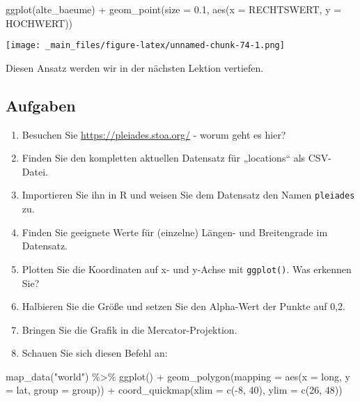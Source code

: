 \documentclass[
  ngerman,
]{article}
\newenvironment{Shaded}{\begin{snugshade}}{\end{snugshade}}
\newcommand{\AttributeTok}[1]{\textcolor[rgb]{0.77,0.63,0.00}{#1}}
\newcommand{\DecValTok}[1]{\textcolor[rgb]{0.00,0.00,0.81}{#1}}
\newcommand{\FloatTok}[1]{\textcolor[rgb]{0.00,0.00,0.81}{#1}}
\newcommand{\FunctionTok}[1]{\textcolor[rgb]{0.00,0.00,0.00}{#1}}
\newcommand{\NormalTok}[1]{#1}
\newcommand{\SpecialCharTok}[1]{\textcolor[rgb]{0.00,0.00,0.00}{#1}}
\newcommand{\StringTok}[1]{\textcolor[rgb]{0.31,0.60,0.02}{#1}}
\begin{document}
\begin{Shaded}
\begin{Highlighting}[]
\FunctionTok{ggplot}\NormalTok{(alte\_baeume) }\SpecialCharTok{+}
    \FunctionTok{geom\_point}\NormalTok{(}\AttributeTok{size =} \FloatTok{0.1}\NormalTok{, }\FunctionTok{aes}\NormalTok{(}\AttributeTok{x =}\NormalTok{ RECHTSWERT, }\AttributeTok{y =}\NormalTok{ HOCHWERT))}
\end{Highlighting}
\end{Shaded}

\texttt{[image: \_main\_files/figure-latex/unnamed-chunk-74-1.png]}

Diesen Ansatz werden wir in der nächsten Lektion vertiefen.

\hypertarget{aufgaben-3}{%
\subsection{Aufgaben}\label{aufgaben-3}}

\begin{enumerate}
\def\labelenumi{\arabic{enumi}.}
\item
  Besuchen Sie \url{https://pleiades.stoa.org/} - worum geht es hier?
\item
  Finden Sie den kompletten aktuellen Datensatz für „locations`` als CSV-Datei.
\item
  Importieren Sie ihn in R und weisen Sie dem Datensatz den Namen \texttt{pleiades} zu.
\item
  Finden Sie geeignete Werte für (einzelne) Längen- und Breitengrade im Datensatz.
\item
  Plotten Sie die Koordinaten auf x- und y-Achse mit \texttt{ggplot()}. Was erkennen Sie?
\item
  Halbieren Sie die Größe und setzen Sie den Alpha-Wert der Punkte auf 0,2.
\item
  Bringen Sie die Grafik in die Mercator-Projektion.
\item
  Schauen Sie sich diesen Befehl an:
\end{enumerate}

\begin{Shaded}
\begin{Highlighting}[]
\FunctionTok{map\_data}\NormalTok{(}\StringTok{"world"}\NormalTok{) }\SpecialCharTok{\%\textgreater{}\%}
  \FunctionTok{ggplot}\NormalTok{() }\SpecialCharTok{+}
    \FunctionTok{geom\_polygon}\NormalTok{(}\AttributeTok{mapping =} \FunctionTok{aes}\NormalTok{(}\AttributeTok{x =}\NormalTok{ long,}
                               \AttributeTok{y =}\NormalTok{ lat,}
                               \AttributeTok{group =}\NormalTok{ group)) }\SpecialCharTok{+}
    \FunctionTok{coord\_quickmap}\NormalTok{(}\AttributeTok{xlim =} \FunctionTok{c}\NormalTok{(}\SpecialCharTok{{-}}\DecValTok{8}\NormalTok{, }\DecValTok{40}\NormalTok{),}
                   \AttributeTok{ylim =} \FunctionTok{c}\NormalTok{(}\DecValTok{26}\NormalTok{, }\DecValTok{48}\NormalTok{))}
\end{Highlighting}
\end{Shaded}
\end{document}
